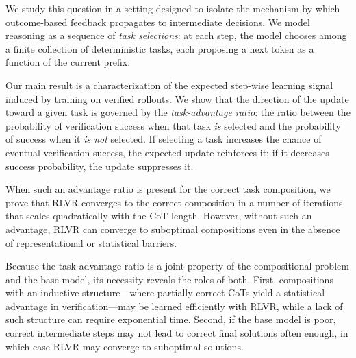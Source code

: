 \documentclass{article}
\theoremstyle{plain}
\theoremstyle{definition}
\theoremstyle{remark}
\begin{document}
We study this question in a setting designed to isolate the mechanism by which outcome-based feedback propagates to intermediate decisions. We model reasoning as a sequence of \emph{task selections}: at each step, the model chooses among a finite collection of deterministic tasks, each proposing a next token as a function of the current prefix. 

Our main result is a characterization of the expected step-wise learning signal induced by training on verified rollouts. We show that the direction of the update toward a given task is governed by the \emph{task-advantage ratio}: the ratio between the probability of verification success when that task \emph{is} selected and the probability of success when it \emph{is not} selected. If selecting a task increases the chance of eventual verification success, the expected update reinforces it; if it decreases success probability, the update suppresses it. 

When such an advantage ratio is present for the correct task composition, we prove that RLVR converges to the correct composition in a number of iterations that scales quadratically with the CoT length.
However, without such an advantage, RLVR can converge to suboptimal compositions even in the absence of representational or statistical barriers.

Because the task-advantage ratio is a joint property of the compositional problem and the base model, its necessity reveals the roles of both. First, compositions with an inductive structure—where partially correct CoTs yield a statistical advantage in verification—may be learned efficiently with RLVR, while a lack of such structure can require exponential time. Second, if the base model is poor, correct intermediate steps may not lead to correct final solutions often enough, in which case RLVR may converge to suboptimal solutions.
\end{document}
